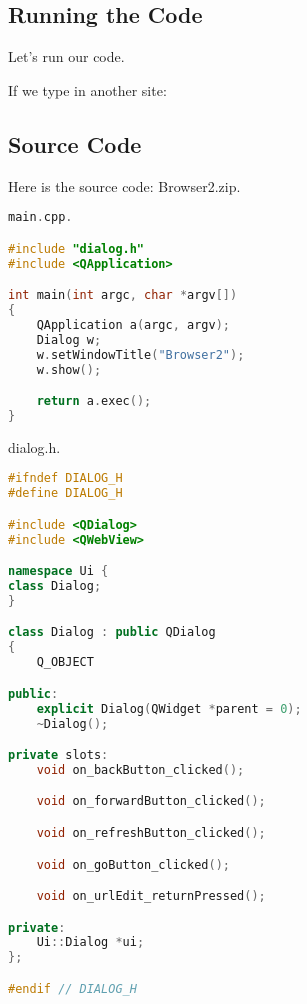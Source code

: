 \subsection{Running the Code}\label{running-the-code}

Let's run our code.

\begin{figure}[htbp]
\centering
{}
\caption{}
\end{figure}

If we type in another site:

\begin{figure}[htbp]
\centering
{}
\caption{}
\end{figure}

\subsection{Source Code}\label{source-code}

Here is the source code: Browser2.zip.

\begin{lstlisting}[language=c++, numbers=none]
main.cpp.

#include "dialog.h"
#include <QApplication>

int main(int argc, char *argv[])
{
    QApplication a(argc, argv);
    Dialog w;
    w.setWindowTitle("Browser2");
    w.show();

    return a.exec();
}
\end{lstlisting}

dialog.h.

\begin{lstlisting}[language=c++, numbers=none]
#ifndef DIALOG_H
#define DIALOG_H

#include <QDialog>
#include <QWebView>

namespace Ui {
class Dialog;
}

class Dialog : public QDialog
{
    Q_OBJECT

public:
    explicit Dialog(QWidget *parent = 0);
    ~Dialog();

private slots:
    void on_backButton_clicked();

    void on_forwardButton_clicked();

    void on_refreshButton_clicked();

    void on_goButton_clicked();

    void on_urlEdit_returnPressed();

private:
    Ui::Dialog *ui;
};

#endif // DIALOG_H
\end{lstlisting}

